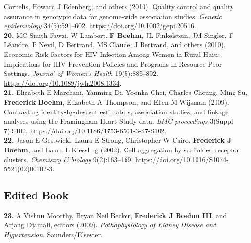 \documentclass[
  10pt,
]
{article}
\begin{document}
Cornelis\normalsize , \normalsize Howard J Edenberg\normalsize , and
others (2010). Quality control and quality assurance in genotypic data
for genome-wide association studies. \emph{Genetic epidemiology}
34(6):591--602. \url{https://doi.org/10.1002/gepi.20516}.\\
\textbf{20.} \normalsize \normalsize MC Smith Fawzi\normalsize ,
\normalsize W Lambert\normalsize ,
\textbf{\normalsize F Boehm}\normalsize , \normalsize JL
Finkelstein\normalsize , \normalsize JM Singler\normalsize ,
\normalsize F Léandre\normalsize , \normalsize P Nevil\normalsize ,
\normalsize D Bertrand\normalsize , \normalsize MS Claude\normalsize ,
\normalsize J Bertrand\normalsize , and others (2010). Economic Risk
Factors for HIV Infection Among Women in Rural Haiti: Implications for
HIV Prevention Policies and Programs in Resource-Poor Settings.
\emph{Journal of Women's Health} 19(5):885--892.
\url{https://doi.org/10.1089/jwh.2008.1334}.\\
\textbf{21.} \normalsize \normalsize Elizabeth E Marchani\normalsize ,
\normalsize Yanming Di\normalsize , \normalsize Yoonha Choi\normalsize ,
\normalsize Charles Cheung\normalsize , \normalsize Ming Su\normalsize ,
\textbf{\normalsize Frederick Boehm}\normalsize , \normalsize Elizabeth
A Thompson\normalsize , and \normalsize Ellen M Wijsman (2009).
Contrasting identity-by-descent estimators, association studies, and
linkage analyses using the Framingham Heart Study data. \emph{BMC
proceedings} 3(Suppl 7):S102.
\url{https://doi.org/10.1186/1753-6561-3-S7-S102}.\\
\textbf{22.} \normalsize \normalsize Jason E Gestwicki\normalsize ,
\normalsize Laura E Strong\normalsize , \normalsize Christopher W
Cairo\normalsize , \textbf{\normalsize Frederick J Boehm}\normalsize ,
and \normalsize Laura L Kiessling (2002). Cell aggregation by scaffolded
receptor clusters. \emph{Chemistry \& biology} 9(2):163--169.
\url{https://doi.org/10.1016/S1074-5521(02)00102-3}.

\subsection{Edited Book}\label{edited-book}

\textbf{23.} \normalsize \normalsize A Vishnu Moorthy\normalsize ,
\normalsize Bryan Neil Becker\normalsize ,
\textbf{\normalsize Frederick J Boehm III}\normalsize , and
\normalsize Arjang Djamali, editors (2009). \emph{Pathophysiology of
Kidney Disease and Hypertension}. Saunders/Elsevier.
\end{document}
